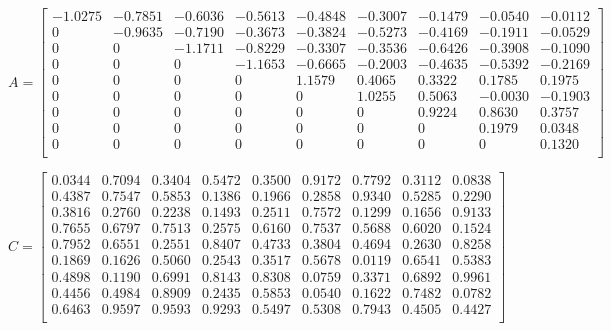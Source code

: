 \documentclass{article}
\begin{document}
$A = \begin{bmatrix}
    -1.0275 & -0.7851 & -0.6036 & -0.5613 & -0.4848 & -0.3007 & -0.1479 & -0.0540 & -0.0112 \\ 
          0 & -0.9635 & -0.7190 & -0.3673 & -0.3824 & -0.5273 & -0.4169 & -0.1911 & -0.0529 \\ 
          0 &       0 & -1.1711 & -0.8229 & -0.3307 & -0.3536 & -0.6426 & -0.3908 & -0.1090 \\ 
          0 &       0 &       0 & -1.1653 & -0.6665 & -0.2003 & -0.4635 & -0.5392 & -0.2169 \\ 
          0 &       0 &       0 &       0 &  1.1579 &  0.4065 &  0.3322 &  0.1785 &  0.1975 \\ 
          0 &       0 &       0 &       0 &       0 &  1.0255 &  0.5063 & -0.0030 & -0.1903 \\ 
          0 &       0 &       0 &       0 &       0 &       0 &  0.9224 &  0.8630 &  0.3757 \\ 
          0 &       0 &       0 &       0 &       0 &       0 &       0 &  0.1979 &  0.0348 \\ 
          0 &       0 &       0 &       0 &       0 &       0 &       0 &       0 &  0.1320 \\ 
    \end{bmatrix}$
    
$C = \begin{bmatrix}
     0.0344 &  0.7094 &  0.3404 &  0.5472 &  0.3500 &  0.9172 &  0.7792 &  0.3112 &  0.0838 \\ 
     0.4387 &  0.7547 &  0.5853 &  0.1386 &  0.1966 &  0.2858 &  0.9340 &  0.5285 &  0.2290 \\ 
     0.3816 &  0.2760 &  0.2238 &  0.1493 &  0.2511 &  0.7572 &  0.1299 &  0.1656 &  0.9133 \\ 
     0.7655 &  0.6797 &  0.7513 &  0.2575 &  0.6160 &  0.7537 &  0.5688 &  0.6020 &  0.1524 \\ 
     0.7952 &  0.6551 &  0.2551 &  0.8407 &  0.4733 &  0.3804 &  0.4694 &  0.2630 &  0.8258 \\ 
     0.1869 &  0.1626 &  0.5060 &  0.2543 &  0.3517 &  0.5678 &  0.0119 &  0.6541 &  0.5383 \\ 
     0.4898 &  0.1190 &  0.6991 &  0.8143 &  0.8308 &  0.0759 &  0.3371 &  0.6892 &  0.9961 \\ 
     0.4456 &  0.4984 &  0.8909 &  0.2435 &  0.5853 &  0.0540 &  0.1622 &  0.7482 &  0.0782 \\ 
     0.6463 &  0.9597 &  0.9593 &  0.9293 &  0.5497 &  0.5308 &  0.7943 &  0.4505 &  0.4427 \\
    \end{bmatrix}$
\end{document}
